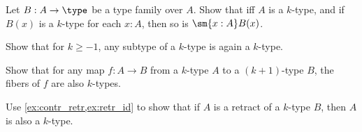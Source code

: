 \begin{exercises}
\item 
\begin{subexenum}
\item Let $B:A\to\type$ be a type family over $A$. Show that iff $A$ is a $k$-type, and if $B(x)$ is a $k$-type for each $x:A$, then so is $\sm{x:A}B(x)$.
\item Show that for $k\geq -1$, any subtype of a $k$-type is again a $k$-type.
\item Show that for any map $f:A\to B$ from a $k$-type $A$ to a $(k+1)$-type $B$, the fibers of $f$ are also $k$-types.
\end{subexenum}
\item Use \autoref{ex:contr_retr,ex:retr_id} to show that if $A$ is a retract of a $k$-type $B$, then $A$ is also a $k$-type.
\end{exercises}

